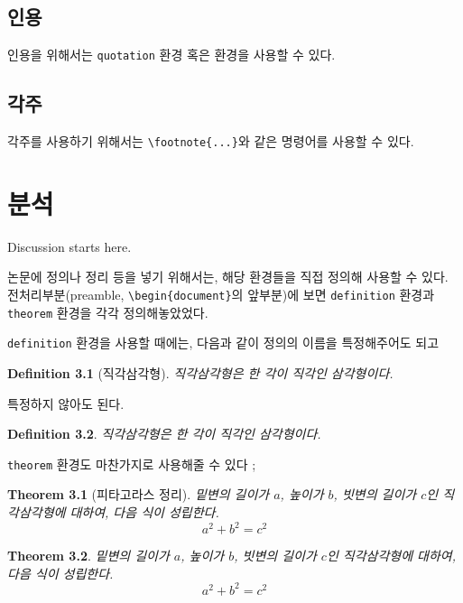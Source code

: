 \documentclass{report}
\newtheorem{theorem}{Theorem} %
\newtheorem{definition}{Definition} %
\begin{document}
\section{인용}
인용을 위해서는 \texttt{quotation} 환경 혹은  환경을 사용할 수 있다.

\section{각주}
각주를 사용하기 위해서는 \verb|\footnote{...}|와 같은 명령어를 사용할 수 있다.

\chapter{분석}\label{chap:discussion}
Discussion starts here.

논문에 정의나 정리 등을 넣기 위해서는, 해당 환경들을 직접 정의해 사용할 수 있다.
전처리부분(preamble, \verb|\begin{document}|의 앞부분)에 보면 \texttt{definition} 환경과 \texttt{theorem} 환경을 각각 정의해놓았었다.

\texttt{definition} 환경을 사용할 때에는, 다음과 같이 정의의 이름을 특정해주어도 되고
\begin{definition}[직각삼각형]
직각삼각형은 한 각이 직각인 삼각형이다. 
\end{definition}
특정하지 않아도 된다.
\begin{definition}
직각삼각형은 한 각이 직각인 삼각형이다. 
\end{definition}

\texttt{theorem} 환경도 마찬가지로 사용해줄 수 있다 ;
\begin{theorem}[피타고라스 정리]
밑변의 길이가 \(a\), 높이가 \(b\), 빗변의 길이가 \(c\)인 직각삼각형에 대하여, 다음 식이 성립한다.
\begin{equation}
a^2+b^2=c^2
\end{equation}
\end{theorem}

\begin{theorem}
밑변의 길이가 \(a\), 높이가 \(b\), 빗변의 길이가 \(c\)인 직각삼각형에 대하여, 다음 식이 성립한다.
\begin{equation}
a^2+b^2=c^2
\end{equation}
\end{theorem}
\end{document}
